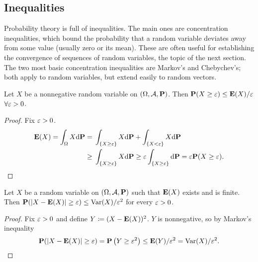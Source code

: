 \documentclass[11pt,letterpaper,reqno,oneside]{article}
\begin{document}
\subsection{Inequalities}
\label{sec:probability:inequalities}

Probability theory is full of inequalities. The main ones are concentration inequalities, which bound the probability that a random variable deviates away from some value (usually zero or its mean). These are often useful for establishing the convergence of sequences of random variables, the topic of the next section. The two most basic concentration inequalities are Markov's and Chebychev's; both apply to random variables, but extend easily to random vectors.


\begin{proposition}
	\label{proposition:Markovs_inequality}
	Let $X$ be a nonnegative random variable on $(\Omega,\mathcal{A},\mathbf{P})$. Then $\mathbf{P}(X \geq \varepsilon) \leq \mathbf{E}(X)/\varepsilon$ $\forall \varepsilon>0$.
\end{proposition}

\begin{proof}
	Fix $\varepsilon>0$.
	\begin{align*}
		\mathbf{E}(X)
		= \int_\Omega X \mathrm{d} \mathbf{P}
		={}& \int_{\{ X \geq \varepsilon \}} X \mathrm{d} \mathbf{P}
		+ \int_{\{ X < \varepsilon \}} X \mathrm{d} \mathbf{P}
		\\
		\geq{}& \int_{\{ X \geq \varepsilon \}} X \mathrm{d} \mathbf{P}
		\geq \varepsilon \int_{\{ X \geq \varepsilon \}} \mathrm{d} \mathbf{P}
		= \varepsilon \mathbf{P}( X \geq \varepsilon ) . \qedhere
	\end{align*}
\end{proof}

\begin{corollary}
	\label{corollary:Chebychevs_inequality}
	Let $X$ be a random variable on $(\Omega,\mathcal{A},\mathbf{P})$ such that $\mathbf{E}(X)$ exists and is finite. Then $\mathbf{P}(\lvert X-\mathbf{E}(X)\rvert \geq \varepsilon) \leq \mathrm{Var}(X)/\varepsilon^2$ for every $\varepsilon>0$.
\end{corollary}

\begin{proof}
	Fix $\varepsilon>0$ and define $Y \coloneqq (X-\mathbf{E}(X))^2$. $Y$ is nonnegative, so by Markov's inequality
	\begin{equation*}
		\mathbf{P}(\lvert X-\mathbf{E}(X)\rvert \geq \varepsilon) 
		= \mathbf{P}\left( Y \geq \varepsilon^2 \right)
		\leq \mathbf{E}(Y)/\varepsilon^2
		= \mathrm{Var}(X)/\varepsilon^2 . \qedhere
	\end{equation*}
\end{proof}
\end{document}
